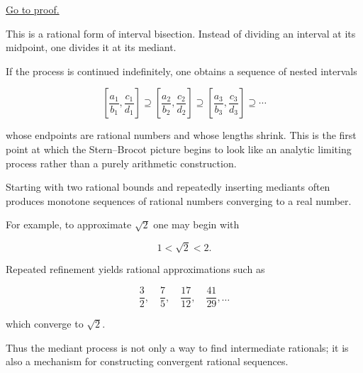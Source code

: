 \begin{remark*}[Proof]
\hyperref[prf:stern-brocot-refinement]{Go to proof.}
\end{remark*}

\begin{remark}
This is a rational form of interval bisection.  Instead of dividing an
interval at its midpoint, one divides it at its mediant.
\end{remark}

\begin{remark}
If the process is continued indefinitely, one obtains a sequence of
nested intervals

\[
\left[\frac{a_1}{b_1},\frac{c_1}{d_1}\right]
\supseteq
\left[\frac{a_2}{b_2},\frac{c_2}{d_2}\right]
\supseteq
\left[\frac{a_3}{b_3},\frac{c_3}{d_3}\right]
\supseteq \cdots
\]

whose endpoints are rational numbers and whose lengths shrink.
This is the first point at which the Stern--Brocot picture begins to
look like an analytic limiting process rather than a purely arithmetic
construction.
\end{remark}


\begin{remark}
Starting with two rational bounds and repeatedly inserting mediants
often produces monotone sequences of rational numbers converging to a
real number.

For example, to approximate $\sqrt{2}$ one may begin with

\[
1 < \sqrt{2} < 2.
\]

Repeated refinement yields rational approximations such as

\[
\frac{3}{2},\quad
\frac{7}{5},\quad
\frac{17}{12},\quad
\frac{41}{29},\dots
\]

which converge to $\sqrt{2}$.

Thus the mediant process is not only a way to find intermediate
rationals; it is also a mechanism for constructing convergent rational
sequences.
\end{remark}


